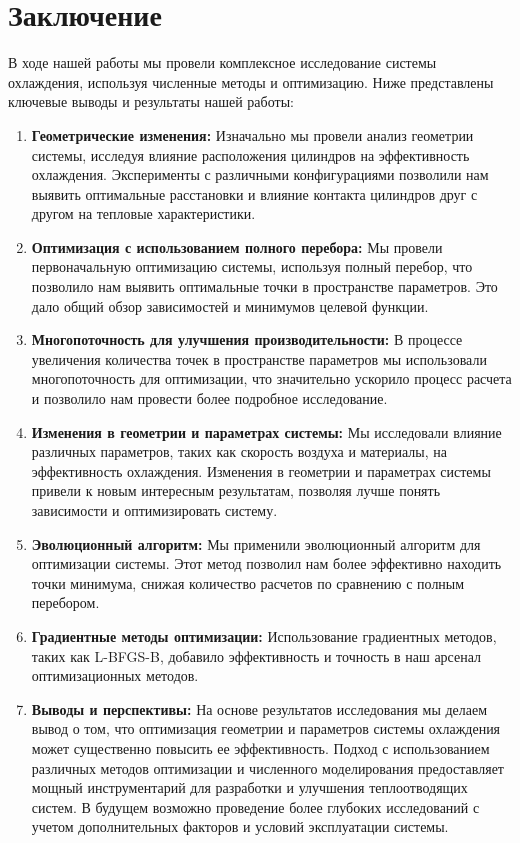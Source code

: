 \documentclass[a4paper,12pt]{article}
\theoremstyle{plain} %
\theoremstyle{definition} %
\theoremstyle{remark} %
\begin{document}
\newpage
\section{Заключение}

В ходе нашей работы мы провели комплексное исследование системы охлаждения, используя численные методы и оптимизацию. Ниже представлены ключевые выводы и результаты нашей работы:

\begin{enumerate}
    \item \textbf{Геометрические изменения:} Изначально мы провели анализ геометрии системы, исследуя влияние расположения цилиндров на эффективность охлаждения. Эксперименты с различными конфигурациями позволили нам выявить оптимальные расстановки и влияние контакта цилиндров друг с другом на тепловые характеристики.

    \item \textbf{Оптимизация с использованием полного перебора:} Мы провели первоначальную оптимизацию системы, используя полный перебор, что позволило нам выявить оптимальные точки в пространстве параметров. Это дало общий обзор зависимостей и минимумов целевой функции.

    \item \textbf{Многопоточность для улучшения производительности:} В процессе увеличения количества точек в пространстве параметров мы использовали многопоточность для оптимизации, что значительно ускорило процесс расчета и позволило нам провести более подробное исследование.

    \item \textbf{Изменения в геометрии и параметрах системы:} Мы исследовали влияние различных параметров, таких как скорость воздуха и материалы, на эффективность охлаждения. Изменения в геометрии и параметрах системы привели к новым интересным результатам, позволяя лучше понять зависимости и оптимизировать систему.

    \item \textbf{Эволюционный алгоритм:} Мы применили эволюционный алгоритм для оптимизации системы. Этот метод позволил нам более эффективно находить точки минимума, снижая количество расчетов по сравнению с полным перебором.

    \item \textbf{Градиентные методы оптимизации:} Использование градиентных методов, таких как L-BFGS-B, добавило эффективность и точность в наш арсенал оптимизационных методов.

    \item \textbf{Выводы и перспективы:} На основе результатов исследования мы делаем вывод о том, что оптимизация геометрии и параметров системы охлаждения может существенно повысить ее эффективность. Подход с использованием различных методов оптимизации и численного моделирования предоставляет мощный инструментарий для разработки и улучшения теплоотводящих систем. В будущем возможно проведение более глубоких исследований с учетом дополнительных факторов и условий эксплуатации системы.
\end{enumerate}
\end{document}
